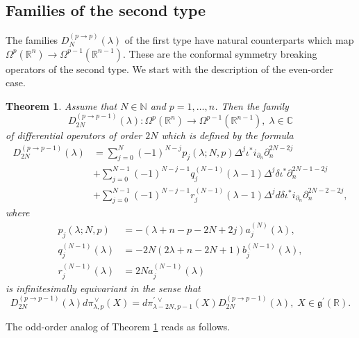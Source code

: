 \documentclass[a4paper,12pt,reqno]{amsart}
\newtheorem{theorem}{Theorem}
\numberwithin{theorem}{subsection}
\numberwithin{equation}{section}
\begin{document}
\subsection{Families of the second type}\label{type2}

The families $D_N^{(p \to p)}(\lambda)$ of the first type have natural
counterparts which map $\Omega^p({\mathbb{R}}^n) \to \Omega^{p-1}({\mathbb{R}}^{n-1})$. These are
the conformal symmetry breaking operators of the second type. We start with the
description of the even-order case.

\begin{theorem}\label{EvenDiffOp-type2} Assume that $N\in{\mathbb{N}}$ and $p=1,\dots,n$. Then the family
\begin{equation*}
   D_{2N}^{(p \to p-1)}(\lambda): \Omega^p({\mathbb{R}}^n) \to \Omega^{p-1}({\mathbb{R}}^{n-1}), \; \lambda\in{\mathbb{C}}
\end{equation*}
of differential operators of order $2N$ which is defined by the formula
\begin{align}\label{even-type2}
   D^{(p \to p-1)}_{2N}(\lambda) & =
   \sum_{j=0}^N(-1)^{N-j} p_j(\lambda;N,p) \Delta^j \iota^* i_{\partial_n} \partial_n^{2N-2j} \nonumber \\
   & + \sum_{j=0}^{N-1}(-1)^{N-j-1} q_j^{(N-1)}(\lambda\!-\!1) \Delta^j
   \delta \iota^*\partial_n^{2N-1-2j} \nonumber\\
   & + \sum_{j=0}^{N-1}(-1)^{N-j-1} r_j^{(N-1)}(\lambda\!-\!1) \Delta^j {d}
   \delta \iota^*i_{\partial_n}\partial_n^{2N-2-2j},
\end{align}
where
\begin{align*}
   p_j(\lambda;N,p) & = -(\lambda\!+\!n\!-\!p\!-\!2N\!+\!2j) a_j^{(N)}(\lambda), \\
   q_j^{(N-1)}(\lambda) & = -2N(2\lambda\!+\!n\!-\!2N\!+\!1) b_j^{(N-1)}(\lambda), \\
   r_j^{(N-1)}(\lambda) & = 2N  a_j^{(N-1)}(\lambda)
\end{align*}
is infinitesimally equivariant in the sense that
\begin{equation}\label{equiv-even}
   D^{(p \to p-1)}_{2N}(\lambda) {d}\pi^{{\,\vee}}_{\lambda,p}(X) = {d}\pi^{\prime {{\,\vee}}}_{\lambda-2N,p-1}(X)
   D^{(p \to p-1)}_{2N}(\lambda), \; X \in {{\mathfrak g}}^{\prime}({\mathbb{R}}).
\end{equation}
\end{theorem}

The odd-order analog of Theorem \ref{EvenDiffOp-type2} reads as follows.
\end{document}

